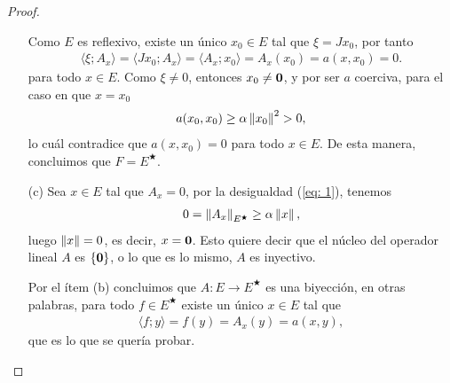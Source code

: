 \begin{proof}
\begin{enumerate}
        Como $E$ es reflexivo, existe un único $x_0 \in E$ tal que $\xi=Jx_0$, por tanto
        \begin{align*}
            \langle \xi;A_x\rangle=\langle Jx_0;A_x\rangle=\langle A_x;x_0\rangle=A_x(x_0)=a(x,x_0)=0.
        \end{align*}
        para todo $x \in E$. Como $\xi\neq 0$, entonces $x_0\neq \mathbf{0}$, y por ser $a$ coerciva, para el caso en que $x=x_0$
        \begin{align*}
            a(x_0,x_0)\geq \alpha\left\|x_0\right\|^2>0,
        \end{align*}
        lo cuál contradice que $a(x,x_0)=0$ para todo $x \in E$. De esta manera, concluimos que $F=E^\bigstar$.

        \item[(c)] Sea $x \in E$ tal que $A_x=0$, por la desigualdad (\ref{eq: 1}), tenemos
        \begin{align*}
            0=\left\|A_x\right\|_{E^\bigstar}\geq \alpha\left\|x\right\|,
        \end{align*}
        luego $\left\|x\right\|=0$, es decir, $x=\mathbf{0}$. Esto quiere decir que el núcleo del operador lineal $A$ es $\{\mathbf{0}\}$, o lo que es lo mismo, $A$ es inyectivo.
        
        Por el ítem (b) concluimos que $A:E\to E^\bigstar$ es una biyección, en otras palabras, para todo $f\in E^\bigstar$ existe un único $x \in E$ tal que 
        \begin{align*}
            \langle f;y\rangle=f(y)=A_x(y)=a(x,y),
        \end{align*}
        que es lo que se quería probar.
    \end{enumerate}
\end{proof}



